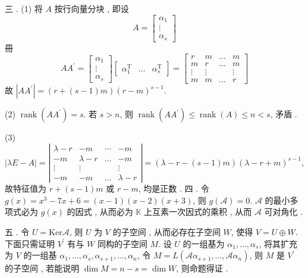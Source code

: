 \documentclass[10pt]{article}
\begin{document}
 三 . (1)  将  $A$  按行向量分块 ,  即设 
$$
A=\left[\begin{array}{c}
\alpha_{1} \\
\vdots \\
\alpha_{s}
\end{array}\right]
$$
 冊 
$$
A A^{\prime}=\left[\begin{array}{c}
\alpha_{1} \\
\vdots \\
\alpha_{s}
\end{array}\right]\left[\begin{array}{ccc}
\alpha_{1}^{\mathrm{T}} & \ldots & \alpha_{s}^{\mathrm{T}}
\end{array}\right]=\left[\begin{array}{cccc}
r & m & \ldots & m \\
m & r & \ldots & m \\
\vdots & \vdots & & \vdots \\
m & m & \ldots & r
\end{array}\right]
$$
 故  $\left|A A^{\prime}\right|=(r+(s-1) m)(r-m)^{s-1}$.

(2) $\operatorname{rank}\left(A A^{\prime}\right)=s$.  若  $s>n$,  则  $\operatorname{rank}\left(A A^{\prime}\right) \leqslant \operatorname{rank}(A) \leqslant n<s$,  矛盾 .

(3)
$$
|\lambda E-A|=\left|\begin{array}{cccc}
\lambda-r & -m & \cdots & -m \\
-m & \lambda-r & \ldots & -m \\
\vdots & \vdots & & \vdots \\
-m & -m & \ldots & \lambda-r
\end{array}\right|=(\lambda-r-(s-1) m)(\lambda-r+m)^{s-1},
$$
 故特征值为  $r+(s-1) m$  或  $r-m$,  均是正数 .  四 .  令  $g(x)=x^{3}-7 x+6=(x-1)(x-2)(x+3)$,  则  $g(\mathscr{A})=0$. $\mathscr{A}$  的最小多项式必为  $g(x)$  的因式 ,  从而必为  $\mathbb{K}$  上互素一次因式的乘积 ,  从而  $\mathscr{A}$  可对角化 .

 五 .  令  $U=\mathrm{Ker} \mathscr{A}$,  则  $U$  为  $V$  的子空间 ,  从而必存在子空间  $W$,  使得  $V=U \oplus W$.  下面只需证明  $V^{\prime}$  有与  $W$  同构的子空间  $M$.  设  $U$  的一组基为  $\alpha_{1}, \ldots, \alpha_{s}$,  将其扩充为  $V$  的一组基  $\alpha_{1}, \ldots, \alpha_{s}, \alpha_{s+1}, \ldots, \alpha_{n}$,  令  $M=L\left(\mathscr{A} \alpha_{s+1}, \ldots, \mathscr{A} \alpha_{n}\right)$,  则  $M$  是  $V^{\prime}$  的子空间 ,  若能说明  $\operatorname{dim} M=n-s=\operatorname{dim} W$,  则命题得证 .
\end{document}
